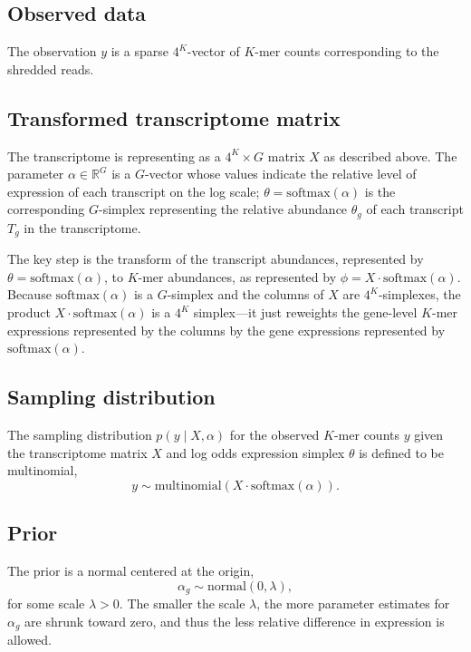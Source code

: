 \documentclass[11pt]{article}
\begin{document}
\subsection{Observed data}

The observation $y$ is a sparse $4^K$-vector of $K$-mer counts
corresponding to the shredded reads.

\subsection{Transformed transcriptome matrix}

The transcriptome is representing as a $4^K \times G$ matrix $X$ as
described above.  The parameter $\alpha \in \mathbb{R}^G$ is a
$G$-vector whose values indicate the relative level of expression of
each transcript on the log scale; $\theta = \textrm{softmax}(\alpha)$
is the corresponding $G$-simplex representing the relative abundance
$\theta_g$ of each transcript $T_g$ in the transcriptome.

The key step is the transform of the transcript abundances,
represented by $\theta = \textrm{softmax}(\alpha)$, to $K$-mer
abundances, as represented by
$\phi = X \cdot \textrm{softmax}(\alpha)$.  Because
$\textrm{softmax}(\alpha)$ is a $G$-simplex and the columns of $X$ are
$4^K$-simplexes, the product $X \cdot \textrm{softmax}(\alpha)$ is a
$4^K$ simplex---it just reweights the gene-level $K$-mer expressions
represented by the columns by the gene expressions represented by
$\textrm{softmax}(\alpha)$.

\subsection{Sampling distribution}

The sampling distribution $p(y \mid X, \alpha)$  for the observed
$K$-mer counts $y$ given the transcriptome matrix $X$ and log odds
expression simplex $\theta$ is defined to be multinomial,
\[
  y \sim \textrm{multinomial}(X \cdot \textrm{softmax}(\alpha)).
\]


\subsection{Prior}

The prior is a normal centered at the origin,
\[
  \alpha_g \sim \textrm{normal}(0, \lambda),
\]
for some scale $\lambda > 0$.  The smaller the scale $\lambda$, the
more parameter estimates for $\alpha_g$ are shrunk toward zero, and
thus the less relative difference in expression is allowed.
\end{document}
